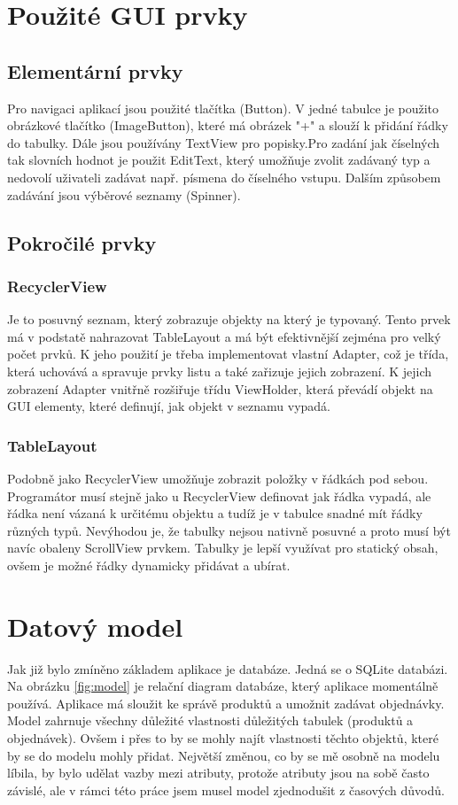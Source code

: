 \documentclass[12pt]{report}
\begin{document}
\section{Použité GUI prvky}
\subsection{Elementární prvky}
Pro navigaci aplikací jsou použité tlačítka (Button). V jedné tabulce je použito obrázkové tlačítko
(ImageButton), které má obrázek "+" a slouží k přidání řádky do tabulky. Dále jsou používány 
TextView pro popisky.Pro zadání jak číselných tak slovních hodnot je použit EditText, který umožňuje
zvolit zadávaný typ a nedovolí uživateli zadávat např. písmena do číselného vstupu. Dalším způsobem
zadávání jsou výběrové seznamy (Spinner).
\subsection{Pokročilé prvky}
\subsubsection{RecyclerView}\label{rv}
Je to posuvný seznam, který zobrazuje objekty na který je typovaný.
Tento prvek má v podstatě nahrazovat TableLayout a má být efektivnější zejména pro velký počet prvků.
K jeho použití je třeba implementovat vlastní Adapter, což je třída, která uchovává a spravuje prvky listu
a také zařizuje jejich zobrazení. K jejich zobrazení Adapter vnitřně rozšiřuje třídu ViewHolder, která 
převádí objekt na GUI elementy, které definují, jak objekt v seznamu vypadá.
\subsubsection{TableLayout}
Podobně jako RecyclerView umožňuje zobrazit položky v řádkách pod sebou. Programátor musí stejně jako u
RecyclerView definovat jak řádka vypadá, ale řádka není vázaná k určitému objektu a tudíž je v tabulce
snadné mít řádky různých typů. Nevýhodou je, že tabulky nejsou nativně posuvné a proto musí být navíc obaleny
ScrollView prvkem. Tabulky je lepší využívat pro statický obsah, ovšem je možné řádky dynamicky přidávat
a ubírat.
%
\section{Datový model}
Jak již bylo zmíněno základem aplikace je databáze. Jedná se o SQLite databázi.
Na obrázku \ref{fig:model} je relační diagram databáze, který aplikace momentálně používá.
Aplikace má sloužit ke správě produktů a umožnit zadávat objednávky. Model zahrnuje všechny důležité
vlastnosti důležitých tabulek (produktů a objednávek). Ovšem i přes to by se mohly najít vlastnosti 
těchto objektů, které by se do modelu mohly přidat. Největší změnou, co by se mě osobně na modelu líbila,
by bylo udělat vazby mezi atributy, protože atributy jsou na sobě často závislé, ale v rámci této
práce jsem musel model zjednodušit z časových důvodů.
\end{document}
